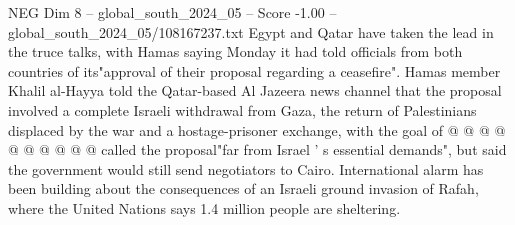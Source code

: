 \begin{textsample}{NEG Dim 8 – global\_south\_2024\_05 – Score -1.00 – global\_south\_2024\_05/108167237.txt}
Egypt and Qatar have taken the lead in the truce talks, with Hamas saying Monday it had told officials from both countries of its"approval of their proposal regarding a ceasefire".
Hamas member Khalil al-Hayya told the Qatar-based Al Jazeera news channel that the proposal involved a complete Israeli withdrawal from Gaza, the return of Palestinians displaced by the war and a hostage-prisoner exchange, with the goal of @ @ @ @ @ @ @ @ @ @ called the proposal"far from Israel ' s essential demands", but said the government would still send negotiators to Cairo.
International alarm has been building about the consequences of an Israeli ground invasion of Rafah, where the United Nations says 1.4 million people are sheltering.

\end{textsample}
